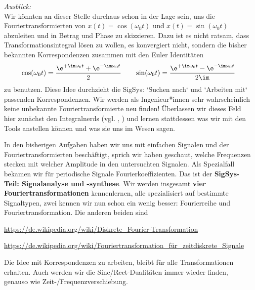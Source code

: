\begin{mdframed}
\textit{Ausblick:}
%
\\\noindent Wir könnten an dieser Stelle durchaus schon in der Lage sein, uns die
Fouriertransformierten von $x(t) = \cos(\omega_0 t)$ und $x(t) = \sin(\omega_0 t)$
abzuleiten und in Betrag und Phase zu skizzieren.
%
Dazu ist es nicht ratsam, dass Transformationsintegral lösen zu wollen,
es konvergiert nicht, sondern die bisher bekannten Korrespondenzen zusammen
mit den Euler Identitäten
\begin{align}
\cos(\omega_0 t) = \frac{\e^{+\im\omega_0 t}+\e^{-\im\omega_0 t}}{2}\qquad
\sin(\omega_0 t) = \frac{\e^{+\im\omega_0 t}-\e^{-\im\omega_0 t}}{2\im}
\end{align}
zu benutzen.
%
Diese Idee durchzieht die SigSys: `Suchen nach` und `Arbeiten mit` passenden
Korrespondenzen. Wir werden als Ingenieur*innen sehr wahrscheinlich keine unbekannte
Fouriertransformierte neu finden! Überlassen wir dieses Feld hier zunächst
den Integralnerds (vgl. \cite{Abramowitz1972}, \cite{Gradshteyn2007}) und lernen
stattdessen was wir mit den Tools anstellen können und was sie uns im Wesen sagen.
\end{mdframed}

%
In den bisherigen Aufgaben haben wir uns mit einfachen Signalen und der
Fouriertransformierten beschäftigt, sprich wir haben geschaut, welche Frequenzen
stecken mit welcher Amplitude in den untersuchten Signalen.
%
Als Spezialfall bekamen wir für periodische Signale Fourierkoeffizienten.
%
Das ist der \textbf{SigSys-Teil: Signalanalyse und -synthese}. Wir werden insgesamt
\textbf{vier Fouriertransformationen} kennenlernen, alle spezialisiert auf bestimmte
Signaltypen, zwei kennen wir nun schon ein wenig besser: Fourierreihe und
Fouriertransformation.
Die anderen beiden sind

\url{https://de.wikipedia.org/wiki/Diskrete_Fourier-Transformation}

\url{https://de.wikipedia.org/wiki/Fouriertransformation_für_zeitdiskrete_Signale}

Die Idee mit Korrespondenzen zu arbeiten, bleibt für alle Transformationen
erhalten. Auch werden wir die Sinc/Rect-Dualitäten immer wieder finden,
genauso wie Zeit-/Frequenzverschiebung.




